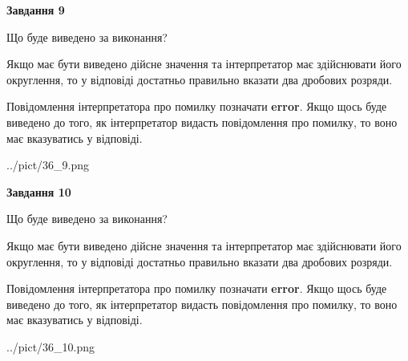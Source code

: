 \documentclass[12pt, ukrainian]{article}
\begin{document}
{\begin {Large}
{\begin {center}\textbf{Завдання 9}\end {center}}\par
Що буде виведено за виконання? \par

Якщо має бути виведено дійсне значення та інтерпретатор має здійснювати його округлення, 
то у відповіді достатньо правильно вказати два дробових розряди.

Повідомлення інтерпретатора про помилку позначати \textbf{error}.
Якщо щось буде виведено до того, як інтерпретатор видасть повідомлення про помилку, 
то воно має вказуватись у відповіді. \par

\begin{center}
	{../pict/36_9.png}
\end{center}
\newpage

{\begin {center}\textbf{Завдання 10}\end {center}}\par
Що буде виведено за виконання? \par

Якщо має бути виведено дійсне значення та інтерпретатор має здійснювати його округлення, 
то у відповіді достатньо правильно вказати два дробових розряди.

Повідомлення інтерпретатора про помилку позначати \textbf{error}.
Якщо щось буде виведено до того, як інтерпретатор видасть повідомлення про помилку, 
то воно має вказуватись у відповіді. \par

\begin{center}
	{../pict/36_10.png}
\end{center}
\newpage

\end {Large}}
\end{document}
